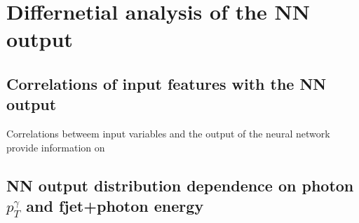 \chapter{Differnetial analysis of the NN output}
\section{Correlations of input features with the NN output}
Correlations betweem input variables and the output of the neural network provide information on  

\section{NN output distribution dependence on photon \texorpdfstring{$p_T^\gamma$}{pTGamma} and fjet+photon energy}

